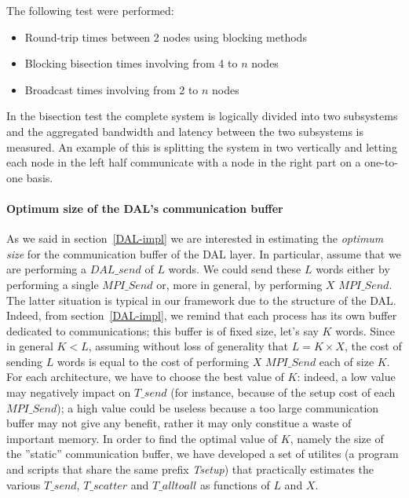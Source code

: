 The following test were performed:
\begin{itemize}
	\item Round-trip times between 2 nodes using blocking methods
	\item Blocking bisection times involving from 4 to $n$ nodes
	\item Broadcast times involving from 2 to $n$ nodes
\end{itemize}
In the bisection test the complete system is logically divided into two subsystems and the aggregated bandwidth and latency between the two subsystems is measured. An example of this is splitting the system in two vertically and letting each node in the left half communicate with a node in the right part on a one-to-one basis.

\paragraph{Optimum size of the DAL's communication buffer}
As we said in section~\ref{DAL-impl} we are interested in estimating the \textit{optimum size} for the communication buffer of the DAL layer. In particular, assume that we are performing a $DAL\_send$ of $L$ words. We could send these $L$ words either by performing a single $MPI\_Send$ or, more in general, by performing $X$ $MPI\_Send$. The latter situation is typical in our framework due to the structure of the DAL. Indeed, from section~\ref{DAL-impl}, we remind that each process has its own buffer dedicated to communications; this buffer is of fixed size, let's say $K$ words. Since in general $K < L$, assuming without loss of generality that $L = K \times X$, the cost of sending $L$ words is equal to the cost of performing $X$ $MPI\_Send$ each of size $K$. For each architecture, we have to choose the best value of $K$: indeed, a low value may negatively impact on $T\_send$ (for instance, because of the setup cost of each $MPI\_Send$); a high value could be useless because a too large communication buffer may not give any benefit, rather it may only constitue a waste of important memory. In order to find the optimal value of $K$, namely the size of the ''static'' communication buffer, we have developed a set of utilites (a program and scripts that share the same prefix  \textit{Tsetup}) that practically estimates the various $T\_send$, $T\_scatter$ and $T\_alltoall$ as functions of $L$ and $X$. 


